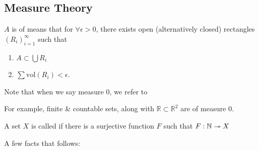 \documentclass{article}
\numberwithin{equation}{section}
\begin{document}
\subsection{Measure Theory}
\begin{definition}
    $A$ is of  means that for $\forall \epsilon > 0$, there exists open (alternatively closed) rectangles $(R_i)_{i=1}^\infty$ such that
    \begin{enumerate}
        \item $A \subset \bigcup R_i$
        \item $\sum \text{vol}(R_i) < \epsilon.$
    \end{enumerate}
    Note that when we say measure 0, we refer to 
\end{definition}
For example, finite \& countable sets, along with $\mathbb{R} \subset \mathbb{R}^2$ are of measure $0$.
\begin{definition}
    A set $X$ is called  if there is a surjective function $F$ such that $F: \mathbb{N} \twoheadrightarrow X$
\end{definition}
A few facts that follows:
\end{document}
